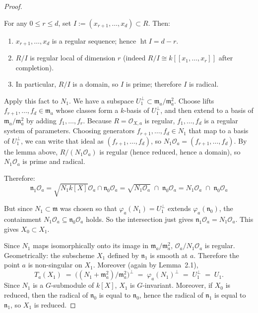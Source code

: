 \documentclass[12pt]{article}
\begin{document}
\begin{proof}
\begin{remark}
    For any $0\leq r\leq d$, set $I:=(x_{r+1},\dots,x_d)\subset R$. Then:
    \begin{enumerate}
        \item $x_{r+1},\dots,x_d$ is a regular sequence; hence $\operatorname{ht} I = d-r$.
        \item $R/I$ is regular local of dimension $r$ (indeed $R/I \cong k[[x_1,\dots,x_r]]$ after completion).
        \item In particular, $R/I$ is a domain, so $I$ is prime; therefore $I$ is radical.
    \end{enumerate}
Apply this fact to $N_1$. We have a subspace $U_1^\perp \subset \mathfrak{m}_a/\mathfrak{m}_a^2$. Choose lifts $f_{r+1},\dots,f_d \in \mathfrak{m}_a$ whose classes form a $k$-basis of $U_1^\perp$, and then extend to a basis of $\mathfrak{m}_a/\mathfrak{m}_a^2$ by adding $f_1,\dots,f_r$. Because $R=\mathcal{O}_{X,a}$ is regular, $f_1,\dots,f_d$ is a regular system of parameters. 
Choosing generators $f_{r+1},\dots,f_d\in N_1$ that map to a basis of $U_1^\perp$, we can write that ideal as $(f_{r+1},\dots,f_d)$, so $N_1\mathcal{O}_a = (f_{r+1},\dots,f_d)$. By the lemma above, $R/(N_1\mathcal{O}_a)$ is regular (hence reduced, hence a domain), so $N_1\mathcal{O}_a$ is prime and radical.
\end{remark}

Therefore:
\[\mathfrak{n}_1\mathcal{O}_a
= \sqrt{N_1k[X]}\mathcal{O}_a \cap \mathfrak{n}_0\mathcal{O}_a
= \sqrt{N_1\mathcal{O}_a}\;\cap\; \mathfrak{n}_0\mathcal{O}_a
= N_1\mathcal{O}_a \;\cap\; \mathfrak{n}_0\mathcal{O}_a\]

But since $N_1\subset \mathfrak{m}$ was chosen so that $\varphi_a(N_1)=U_1^\perp$ extends $\varphi_a(\mathfrak{n}_0)$, the containment
$N_1\mathcal{O}_a \subseteq \mathfrak{n}_0\mathcal{O}_a$
holds. So the intersection just gives
$\mathfrak{n}_1\mathcal{O}_a = N_1\mathcal{O}_a$. This gives $X_0 \subset X_1$.

Since $N_1$ maps isomorphically onto its image in $\mathfrak{m}_a/\mathfrak{m}_a^2$, $\mathcal{O}_a / N_1\mathcal{O}_a$ is regular. Geometrically: the subscheme $X_1$ defined by $\mathfrak{n}_1$ is smooth at $a$. Therefore the point $a$ is non-singular on $X_1$. Moreover (again by Lemma~2.1),
\[
   T_a(X_1) \;=\; \big( (N_1 + \mathfrak{m}_a^2)/\mathfrak{m}_a^2 \big)^\perp 
   \;=\; \varphi_a(N_1)^\perp 
   \;=\; U_1^\perp 
   \;=\; U_1.
\]
Since $N_1$ is a $G$-submodule of $k[X]$, $X_1$ is $G$-invariant.  
Moreover, if $X_0$ is reduced, then the radical of $\mathfrak{n}_0$ is equal to $\mathfrak{n}_0$, hence the radical of $\mathfrak{n}_1$ is equal to $\mathfrak{n}_1$, so $X_1$ is reduced.
\end{proof}
\end{document}
